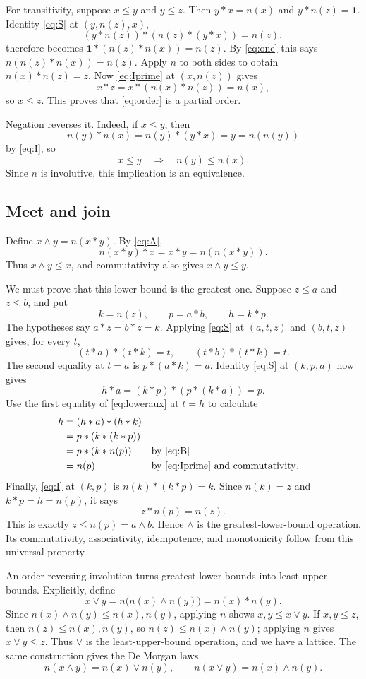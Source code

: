 \documentclass[11pt,a4paper]{article}
\newcommand{\one}{\mathbf{1}}
\begin{document}
For transitivity, suppose $x\leq y$ and $y\leq z$. Then
$y*x=n(x)$ and $y*n(z)=\one$. Identity \eqref{eq:S} at $(y,n(z),x)$,
\[
 (y*n(z))*(n(z)*(y*x))=n(z),
\]
therefore becomes
$\one*(n(z)*n(x))=n(z)$.
By \eqref{eq:one} this says $n(n(z)*n(x))=n(z)$.
Apply $n$ to both sides to obtain $n(x)*n(z)=z$.
Now \eqref{eq:Iprime} at $(x,n(z))$ gives
\[
 x*z=x*(n(x)*n(z))=n(x),
\]
so $x\leq z$. This proves that \eqref{eq:order} is a partial order.

Negation reverses it. Indeed, if $x\leq y$, then
\[
 n(y)*n(x)=n(y)*(y*x)=y=n(n(y))
\]
by \eqref{eq:I}, so
\begin{equation}
 x\leq y\quad\Longrightarrow\quad n(y)\leq n(x).\label{eq:anti}
\end{equation}
Since $n$ is involutive, this implication is an equivalence.

\subsection{Meet and join}
Define $x\wedge y=n(x*y)$. By \eqref{eq:A},
\[
 n(x*y)*x=x*y=n(n(x*y)).
\]
Thus $x\wedge y\leq x$, and commutativity also gives
$x\wedge y\leq y$.

We must prove that this lower bound is the greatest one. Suppose
$z\leq a$ and $z\leq b$, and put
\[
 k=n(z),\qquad p=a*b,\qquad h=k*p.
\]
The hypotheses say $a*z=b*z=k$. Applying \eqref{eq:S} at
$(a,t,z)$ and $(b,t,z)$ gives, for every $t$,
\begin{equation}
 (t*a)*(t*k)=t,\qquad (t*b)*(t*k)=t.\label{eq:loweraux}
\end{equation}
The second equality at $t=a$ is $p*(a*k)=a$.
Identity \eqref{eq:S} at $(k,p,a)$ now gives
\[
 h*a=(k*p)*(p*(k*a))=p.
\]
Use the first equality of \eqref{eq:loweraux} at $t=h$ to calculate
\[
 \begin{aligned}
 h&=(h*a)*(h*k)\\
  &=p*(k*(k*p))\\
  &=p*(k*n(p)) &&\text{by \eqref{eq:B}}\\
  &=n(p) &&\text{by \eqref{eq:Iprime} and commutativity}.
 \end{aligned}
\]
Finally, \eqref{eq:I} at $(k,p)$ is $n(k)*(k*p)=k$. Since
$n(k)=z$ and $k*p=h=n(p)$, it says
\[
 z*n(p)=n(z).
\]
This is exactly $z\leq n(p)=a\wedge b$. Hence $\wedge$ is the
greatest-lower-bound operation. Its commutativity, associativity,
idempotence, and monotonicity follow from this universal property.

An order-reversing involution turns greatest lower bounds into least
upper bounds. Explicitly, define
\[
 x\vee y=n\bigl(n(x)\wedge n(y)\bigr)=n(x)*n(y).
\]
Since $n(x)\wedge n(y)\leq n(x),n(y)$, applying $n$ shows
$x,y\leq x\vee y$. If $x,y\leq z$, then
$n(z)\leq n(x),n(y)$, so $n(z)\leq n(x)\wedge n(y)$;
applying $n$ gives $x\vee y\leq z$.
Thus $\vee$ is the least-upper-bound operation, and we have a lattice.
The same construction gives the De Morgan laws
\begin{equation}
 n(x\wedge y)=n(x)\vee n(y),\qquad
 n(x\vee y)=n(x)\wedge n(y).\label{eq:demorgan}
\end{equation}
\end{document}
